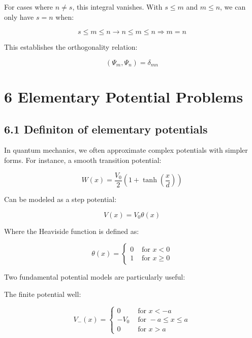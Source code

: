 \documentclass[italian]{HKNdocument}
\begin{document}
For cases where $n \neq s$, this integral vanishes. With $s \leq m$ and $m \leq n$, we can only have $s = n$ when:

\begin{equation*}
s \leq m \leq n \rightarrow n \leq m \leq n \Longrightarrow m=n \tag{5.74}
\end{equation*}

This establishes the orthogonality relation:

\begin{equation*}
\left(\Psi_{m}, \Psi_{n}\right)=\delta_{m n} \tag{5.75}
\end{equation*}

\section*{6 Elementary Potential Problems}
\subsection*{6.1 Definiton of elementary potentials}

In quantum mechanics, we often approximate complex potentials with simpler forms. For instance, a smooth transition potential:

\begin{equation*}
W(x)=\frac{V_{0}}{2}\left(1+\tanh \left(\frac{x}{d}\right)\right) \tag{6.1}
\end{equation*}

Can be modeled as a step potential:

\begin{equation*}
V(x)=V_{0} \theta(x) \tag{6.2}
\end{equation*}

Where the Heaviside function is defined as:

\[
\theta(x)= \begin{cases}0 & \text { for } x<0  \tag{6.3}\\ 1 & \text { for } x \geq 0\end{cases}
\]

Two fundamental potential models are particularly useful:

The finite potential well:

\[
V_{-}(x)= \begin{cases}0 & \text { for } x<-a  \tag{6.4}\\ -V_{0} & \text { for }-a \leq x \leq a \\ 0 & \text { for } x>a\end{cases}
\]
\end{document}

